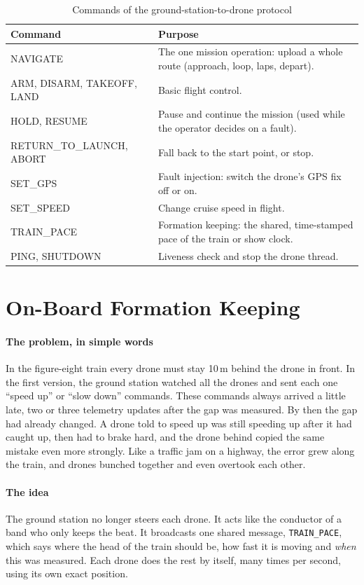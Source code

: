 \documentclass[11pt,a4paper,oneside]{report}
\newcommand{\code}[1]{\texttt{#1}}
\begin{document}
\begin{table}[H]
\caption{Commands of the ground-station-to-drone protocol}\label{tab:commands}
\small
\begin{tabularx}{\textwidth}{@{}>{\ttfamily\footnotesize}P{0.28\textwidth}Y@{}}
\toprule
\textbf{\normalfont\small Command} & \textbf{Purpose} \\
\midrule
NAVIGATE & The one mission operation: upload a whole route (approach, loop, laps, depart). \\
ARM, DISARM, TAKEOFF, LAND & Basic flight control. \\
HOLD, RESUME & Pause and continue the mission (used while the operator decides on a fault). \\
RETURN\_TO\_LAUNCH, ABORT & Fall back to the start point, or stop. \\
SET\_GPS & Fault injection: switch the drone's GPS fix off or on. \\
SET\_SPEED & Change cruise speed in flight. \\
TRAIN\_PACE & Formation keeping: the shared, time-stamped pace of the train or show clock. \\
PING, SHUTDOWN & Liveness check and stop the drone thread. \\
\bottomrule
\end{tabularx}
\end{table}

\section{On-Board Formation Keeping}\label{sec:pace}
\paragraph{The problem, in simple words}
In the figure-eight train every drone must stay 10\,m behind the drone in front. In the first
version, the ground station watched all the drones and sent each one ``speed up'' or ``slow
down'' commands. These commands always arrived a little late, two or three telemetry updates
after the gap was measured. By then the gap had already changed. A drone told to speed up was
still speeding up after it had caught up, then had to brake hard, and the drone behind copied
the same mistake even more strongly. Like a traffic jam on a highway, the error grew along the
train, and drones bunched together and even overtook each other.

\paragraph{The idea}
The ground station no longer steers each drone. It acts like the conductor of a band who only
keeps the beat. It broadcasts one shared message, \code{TRAIN\_PACE}, which says where the head
of the train should be, how fast it is moving and \emph{when} this was measured. Each drone does
the rest by itself, many times per second, using its own exact position.
\end{document}
